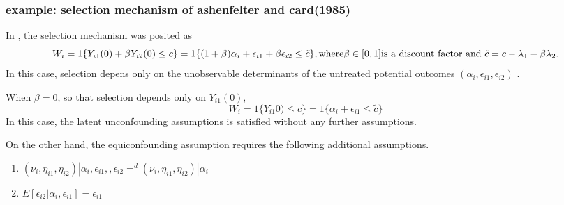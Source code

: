 \documentclass{article}
\begin{document}
 

\subsubsection{example: selection mechanism of ashenfelter and card(1985)}
In \cite{ashenfelter and card 19 85} , the selection mechanism was posited as 
\begin{equation}
    W_i = 1\{ Y_{i1}(0) + \beta Y_{i2} ( 0) \leq c \} =  1 \{  (1 + \beta ) \alpha_i + \epsilon_{i1} + \beta \epsilon_{i2} \leq \tilde{c} \} ,\\
    \text{where} \beta \in [0,1] \text{is a discount factor and } \tilde{c} = c - \lambda_1 - \beta \lambda_2 .\\
    
\end{equation}
In this case, selection depens only on the unobservable determinants of the untreated potential outcomes $( \alpha_i , \epsilon_{i1}, \epsilon_{i2} ) $ .

When $\beta = 0 $, so that selection depends only on $Y_{i1} (0) $, 
\begin{equation}
    W_i = 1 \{ Y_{i1}0) \leq c \} = 1 \{ \alpha_i  + \epsilon_{i1} \leq \tilde{c} \}
    
\end{equation}
In this case, the latent unconfounding assumptions is satisfied without any further assumptions. 

On the other hand,  the equiconfounding assumption requires the following additional assumptions.
\begin{enumerate}
    \item $ ( \nu_i, \eta_{i1} , \eta_{i2} ) | \alpha_i , \epsilon_{i1}, , \epsilon_{i2} =^d ( \nu_i , \eta_{i1}, \eta_{i2} ) | \alpha_i$
    \item $ E [ \epsilon_{i2} | \alpha_i , \epsilon_{i1} ] = \epsilon_{i1}$
\end{enumerate}
\end{document}
